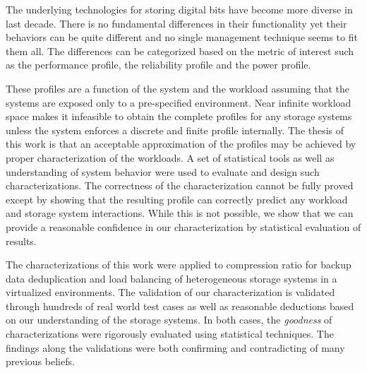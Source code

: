 
The underlying technologies for storing digital bits have become more diverse in last decade. 
There is no fundamental differences in their functionality yet their behaviors can be quite different and no single management technique seems to fit them all. 
The differences can be categorized based on the metric of interest such as the performance profile, the reliability profile and the power profile.
 
These profiles are a function of the system and the workload assuming that the systems are exposed only to a pre-specified environment. 
Near infinite workload space makes it infeasible to obtain the complete profiles for any storage systems unless the system enforces a discrete and finite profile internally.
The thesis of this work is that an acceptable approximation of the profiles may be achieved by proper characterization of the workloads. 
A set of statistical tools as well as understanding of system behavior were used to evaluate and design such characterizations. 
The correctness of the characterization cannot be fully proved except by showing that the resulting profile can correctly predict any workload and storage system interactions. 
While this is not possible, we show that we can provide a reasonable confidence in our characterization by statistical evaluation of results. 

The characterizations of this work were applied to compression ratio for backup data deduplication and load balancing of heterogeneous storage systems in a virtualized environments. 
The validation of our characterization is validated through hundreds of real world test cases as well as reasonable deductions based on our understanding of the storage systems. 
In both cases, the \emph{goodness} of characterizations were rigorously evaluated using statistical techniques.
The findings along the validations were both confirming and contradicting of many previous beliefs. 

